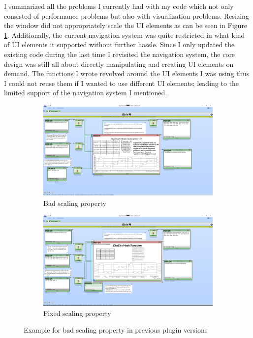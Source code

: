 I summarized all the problems I currently had with my code which not only consisted of performance problems but also with visualization problems. Resizing the window did not appropriately scale the UI elements as can be seen in Figure \ref{fig:plugin.scaling.bug}. Additionally, the current navigation system was quite restricted in what kind of UI elements it supported without further hassle. Since I only updated the existing code during the last time I revisited the navigation system, the core design was still all about directly manipulating and creating UI elements on demand. The functions I wrote revolved around the UI elements I was using thus I could not reuse them if I wanted to use different UI elements; leading to the limited support of the navigation system I mentioned.

\begin{figure}
\begin{subfigure}{\textwidth}
\centering
\includegraphics[width=\textwidth]{figures/ct2/scaling-bug-example.png}
\caption{Bad scaling property}
\label{fig:plugin.scaling.bug}
\end{subfigure}
\begin{subfigure}{\textwidth}
\centering
\includegraphics[width=\textwidth]{figures/ct2/scaling-bug-fixed.png}
\caption{Fixed scaling property}
\label{fig:plugin.scaling.fix}
\end{subfigure}
\caption{Example for bad scaling property in previous plugin versions}
\end{figure}

